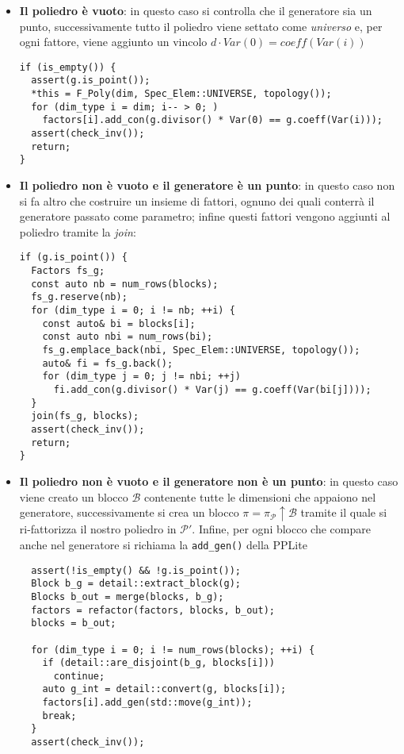 \documentclass{mimosis}
\theoremstyle{definition}
\begin{document}
\begin{itemize}
\item \textbf{Il poliedro è vuoto}: in questo caso si controlla che il generatore sia un
punto, successivamente tutto il poliedro viene settato come \emph{universo} e, per
ogni fattore, viene aggiunto un vincolo \(d \cdot \mathit{Var}(0) = \mathit{coeff}(\mathit{Var}(i))\)
\lstset{style=mystyle,language=C++,label= ,caption= ,captionpos=b,numbers=none}
\begin{lstlisting}
if (is_empty()) {
  assert(g.is_point());
  *this = F_Poly(dim, Spec_Elem::UNIVERSE, topology());
  for (dim_type i = dim; i-- > 0; )
    factors[i].add_con(g.divisor() * Var(0) == g.coeff(Var(i)));
  assert(check_inv());
  return;
}
\end{lstlisting}
\item \textbf{Il poliedro non è vuoto e il generatore è un punto}: in questo caso non si fa
altro che costruire un insieme di fattori, ognuno dei quali conterrà il
generatore passato come parametro; infine questi fattori vengono aggiunti al
poliedro tramite la \emph{join}:
\lstset{style=mystyle,language=C++,label= ,caption= ,captionpos=b,numbers=none}
\begin{lstlisting}
if (g.is_point()) {
  Factors fs_g;
  const auto nb = num_rows(blocks);
  fs_g.reserve(nb);
  for (dim_type i = 0; i != nb; ++i) {
    const auto& bi = blocks[i];
    const auto nbi = num_rows(bi);
    fs_g.emplace_back(nbi, Spec_Elem::UNIVERSE, topology());
    auto& fi = fs_g.back();
    for (dim_type j = 0; j != nbi; ++j)
      fi.add_con(g.divisor() * Var(j) == g.coeff(Var(bi[j])));
  }
  join(fs_g, blocks);
  assert(check_inv());
  return;
}
\end{lstlisting}
\item \textbf{Il poliedro non è vuoto e il generatore non è un punto}: in questo caso viene
creato un blocco \(\mathcal{B}\) contenente tutte le dimensioni che appaiono
nel generatore, successivamente si crea un blocco \(\pi =
  \pi_{\mathcal{P}} \uparrow \mathcal{B}\) tramite il quale si ri-fattorizza il
nostro poliedro in \(\mathcal{P}'\). Infine, per ogni blocco che compare anche
nel generatore si richiama la \texttt{add\_gen()} della PPLite
\lstset{style=mystyle,language=C++,label= ,caption= ,captionpos=b,numbers=none}
\begin{lstlisting}
  assert(!is_empty() && !g.is_point());
  Block b_g = detail::extract_block(g);
  Blocks b_out = merge(blocks, b_g);
  factors = refactor(factors, blocks, b_out);
  blocks = b_out;

  for (dim_type i = 0; i != num_rows(blocks); ++i) {
    if (detail::are_disjoint(b_g, blocks[i]))
      continue;
    auto g_int = detail::convert(g, blocks[i]);
    factors[i].add_gen(std::move(g_int));
    break;
  }
  assert(check_inv());
\end{lstlisting}
\end{itemize}
\end{document}
